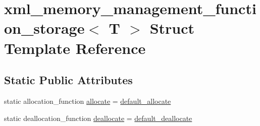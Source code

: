 \hypertarget{structxml__memory__management__function__storage}{\section{xml\-\_\-memory\-\_\-management\-\_\-function\-\_\-storage$<$ T $>$ Struct Template Reference}
\label{structxml__memory__management__function__storage}
}
\subsection*{Static Public Attributes}
\begin{DoxyCompactItemize}
\item 
static allocation\-\_\-function \hyperlink{structxml__memory__management__function__storage_abb6865f8d07d27fd9273737c59f6e941}{allocate} = \hyperlink{pugixml_8cpp_a5c5a3cf417e46e0b3f5207fb9c6a5c18}{default\-\_\-allocate}
\item 
static deallocation\-\_\-function \hyperlink{structxml__memory__management__function__storage_a1c80a9a045ed6cfb90b17a178e4b3512}{deallocate} = \hyperlink{pugixml_8cpp_a04da64bb4806c0b7491d5d9d73d50100}{default\-\_\-deallocate}
\end{DoxyCompactItemize}



